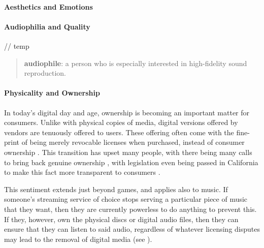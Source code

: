             \paragraph{Aesthetics and Emotions}
    
            \paragraph{Audiophilia and Quality} // temp %
    
                \begin{quote}
                    \textbf{audiophile}: a person who is especially interested in high-fidelity sound reproduction. \cite{audiophile2025}
                \end{quote}
    
          
            \paragraph{Physicality and Ownership}
    
                In today's digital day and age, ownership is becoming an important matter for consumers. Unlike with physical copies of media, digital versions offered by vendors are tenuously offered to users. These offering often come with the fine-print of being merely revocable \cite{polygon2024cartoon_network_delisting} licenses when purchased, instead of consumer ownership \cite{verge2024steam_license}. This transition has upset many people, with there being many calls to bring back genuine ownership \cite{stanton2024gamers_pushback}, with legislation even being passed in California to make this fact more transparent to consumers \cite{california2024ab2426}.
    
                This sentiment extends just beyond games, and applies also to music. If someone's streaming service of choice stops serving a particular piece of music that they want, then they are currently powerless to do anything to prevent this. If they, however, own the physical discs or digital audio files, then they can ensure that they can listen to said audio, regardless of whatever licensing disputes may lead to the removal of digital media (see \cite{bains2022lotr_strategy}).
    

